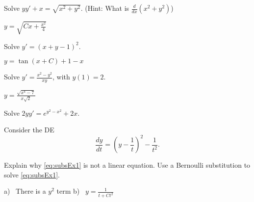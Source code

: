 \begin{exercise}
Solve $yy' + x = \sqrt{x^2 + y^2}$. (Hint: What is $\frac{d}{dx}(x^2 + y^2)$)
\end{exercise}
\comboSol{%
}
{%
$y = \sqrt{Cx + \frac{x^2}{4}}$
}

\begin{exercise}
Solve $y' = {(x+y-1)}^2$.
\end{exercise}
\comboSol{%
}
{%
$y = \tan(x+C) + 1 - x$
}

\begin{exercise}
Solve $y' = \frac{x^2-y^2}{x y}$, with $y(1) = 2$.
\end{exercise}
\comboSol{%
}
{%
$y = \frac{\sqrt{x^4 - 7}}{x\sqrt{2}}$
}

\begin{exercise}\ansMark
Solve $2yy' = e^{y^2-x^2} + 2x$.
\end{exercise}

\begin{exercise}
Consider the  DE 
\begin{equation}
\frac{dy}{dt}=\left( y -\frac{1}{t} \right)^2 - \frac{1}{t^2}. \label{eq:subsEx1}
\end{equation} %
\begin{tasks}
\task Explain why \eqref{eq:subsEx1} is not a linear equation.
\task Use a Bernoulli substitution to solve \eqref{eq:subsEx1}.
\end{tasks}
\end{exercise}
\comboSol{%
}
{%
a)~ There is a $y^2$ term \quad b)~ $y = \frac{1}{t + Ct^2}$
}

\setcounter{exercise}{100}
